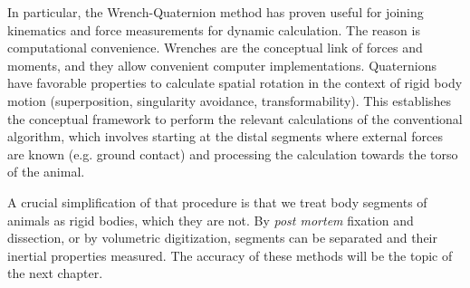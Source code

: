 \documentclass[10pt,a4paper]{article}
\begin{document}
In particular, the Wrench-Quaternion method \citep{Dumas2004} has proven useful for joining kinematics and force measurements for dynamic calculation.
The reason is computational convenience.
Wrenches are the conceptual link of forces and moments, and they allow convenient computer implementations.
Quaternions have favorable properties to calculate spatial rotation in the context of rigid body motion (superposition, singularity avoidance, transformability).
This establishes the conceptual framework to perform the relevant calculations of the conventional algorithm, which involves starting at the distal segments where external forces are known (e.g. ground contact) and processing the calculation towards the torso of the animal.


A crucial simplification of that procedure is that we treat body segments of animals as rigid bodies, which they are not.
By \emph{post mortem} fixation and dissection, or by volumetric digitization, segments can be separated and their inertial properties measured.
The accuracy of these methods will be the topic of the next chapter.
\end{document}
